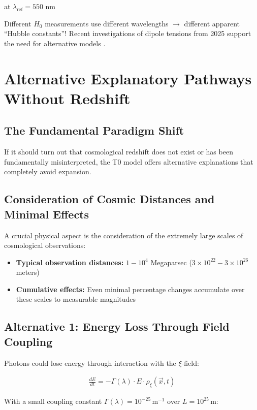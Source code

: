 \documentclass{article}
\begin{document}
	at $\lambda_{\text{ref}} = 550$ nm
	
	Different $H_0$ measurements use different wavelengths $\rightarrow$ different apparent ``Hubble constants''! Recent investigations of dipole tensions from 2025 support the need for alternative models \cite{landstry2025, bengaly2025}.
	
	\section{Alternative Explanatory Pathways Without Redshift}
	
	\subsection{The Fundamental Paradigm Shift}
	
	If it should turn out that cosmological redshift does not exist or has been fundamentally misinterpreted, the T0 model offers alternative explanations that completely avoid expansion.
	
	\subsection{Consideration of Cosmic Distances and Minimal Effects}
	
	A crucial physical aspect is the consideration of the extremely large scales of cosmological observations:
	
	\begin{itemize}
		\item \textbf{Typical observation distances:} $1 - 10^4$ Megaparsec ($3 \times 10^{22} - 3 \times 10^{26}$ meters)
		\item \textbf{Cumulative effects:} Even minimal percentage changes accumulate over these scales to measurable magnitudes
	\end{itemize}
	
	\subsection{Alternative 1: Energy Loss Through Field Coupling}
	
	Photons could lose energy through interaction with the $\xi$-field:
	
	\begin{align}
		\frac{dE}{dt} = -\Gamma(\lambda) \cdot E \cdot \rho_\xi(\vec{x},t)
	\end{align}
	
	With a small coupling constant $\Gamma(\lambda) = 10^{-25} \, \text{m}^{-1}$ over $L = 10^{25} \, \text{m}$:
	
\end{document}
